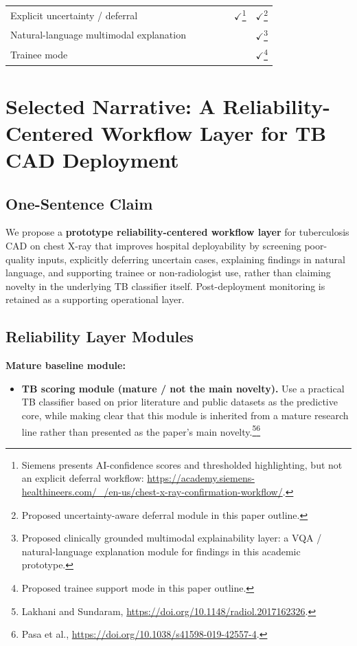 \documentclass[11pt]{article}
\begin{document}
{\begin{longtable}{p{} p{} p{} p{} p{} p{} p{}}
Explicit uncertainty / deferral &  &  &  &  & $\checkmark$\footnote{Siemens presents AI-confidence scores and thresholded highlighting, but not an explicit deferral workflow: \url{https://academy.siemens-healthineers.com/_/en-us/chest-x-ray-confirmation-workflow/}.} & $\checkmark$\footnote{Proposed uncertainty-aware deferral module in this paper outline.} \\

Natural-language multimodal explanation &  &  &  &  &  & $\checkmark$\footnote{Proposed clinically grounded multimodal explainability layer: a VQA / natural-language explanation module for findings in this academic prototype.} \\

Trainee mode &  &  &  &  &  & $\checkmark$\footnote{Proposed trainee support mode in this paper outline.} \\
\bottomrule
\end{longtable}
}

\section{Selected Narrative: A Reliability-Centered Workflow Layer for TB CAD Deployment}

\subsection{One-Sentence Claim}

We propose a \textbf{prototype reliability-centered workflow layer} for tuberculosis CAD on chest X-ray that improves hospital deployability by screening poor-quality inputs, explicitly deferring uncertain cases, explaining findings in natural language, and supporting trainee or non-radiologist use, rather than claiming novelty in the underlying TB classifier itself. Post-deployment monitoring is retained as a supporting operational layer.

\subsection{Reliability Layer Modules}

\textbf{Mature baseline module:}
\begin{itemize}[leftmargin=1.5em]
    \item \textbf{TB scoring module (mature / not the main novelty).} Use a practical TB classifier based on prior literature and public datasets as the predictive core, while making clear that this module is inherited from a mature research line rather than presented as the paper's main novelty.\footnote{Lakhani and Sundaram, \url{https://doi.org/10.1148/radiol.2017162326}.}\footnote{Pasa et al., \url{https://doi.org/10.1038/s41598-019-42557-4}.}
\end{itemize}
\end{document}
